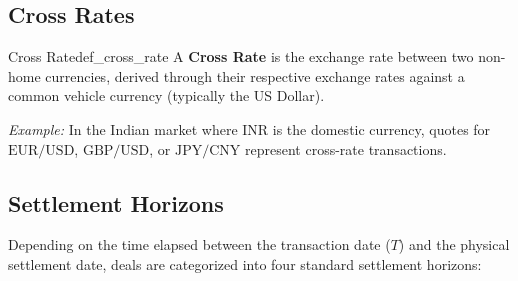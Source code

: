 \subsection{Cross Rates}
\begin{definition}{Cross Rate}{def_cross_rate}
A \textbf{Cross Rate} is the exchange rate between two non-home currencies, derived through their respective exchange rates against a common vehicle currency (typically the US Dollar).
\end{definition}
\noindent\textit{Example:} In the Indian market where INR is the domestic currency, quotes for $\text{EUR}/\text{USD}$, $\text{GBP}/\text{USD}$, or $\text{JPY}/\text{CNY}$ represent cross-rate transactions.

\subsection{Settlement Horizons}
Depending on the time elapsed between the transaction date ($T$) and the physical settlement date, deals are categorized into four standard settlement horizons:

